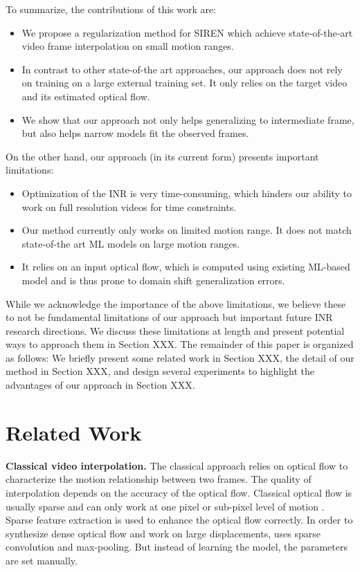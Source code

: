 \documentclass{article}
\begin{document}
To summarize, the contributions of this work are:
\begin{itemize}
\item We propose a regularization method for SIREN which achieve state-of-the-art video frame interpolation on small motion ranges.
\item In contrast to other state-of-the art approaches, our approach does not rely on training on a large external training set.
It only relies on the target video and its estimated optical flow.
\item We show that our approach not only helps generalizing to intermediate frame,
but also helps narrow models fit the observed frames.
\end{itemize}

On the other hand, our approach (in its current form) presents important limitations:

\begin{itemize}
\item Optimization of the INR is very time-consuming, which hinders our ability to work on full resolution videos for time constraints.
\item Our method currently only works on limited motion range. It does not match state-of-the art ML models on large motion ranges.
\item It relies on an input optical flow, which is computed using existing ML-based model and is thus prone to domain shift generalization errors.
\end{itemize}

While we acknowledge the importance of the above limitations,
we believe these to not be fundamental limitations of our approach but important future INR research directions.
We discuss these limitations at length and present potential ways to approach them in Section XXX.
The remainder of this paper is organized as follows:
We briefly present some related work in Section XXX, the detail of our method in Section XXX,
and design several experiments to highlight the advantages of our approach in Section XXX.

\section{Related Work}
\textbf{Classical video interpolation.}
The classical approach relies on optical flow to characterize the motion relationship between two frames.
The quality of interpolation depends on the accuracy of the optical flow.
Classical optical flow is usually sparse and can only work at one pixel or sub-pixel level of motion \cite{chen2012real}.
Sparse feature extraction \cite{liu2008sift} is used to enhance the optical flow correctly.
In order to synthesize dense optical flow and work on large displacements, \cite{weinzaepfel2013deepflow} uses sparse convolution and max-pooling.
But instead of learning the model, the parameters are set manually.
\end{document}
